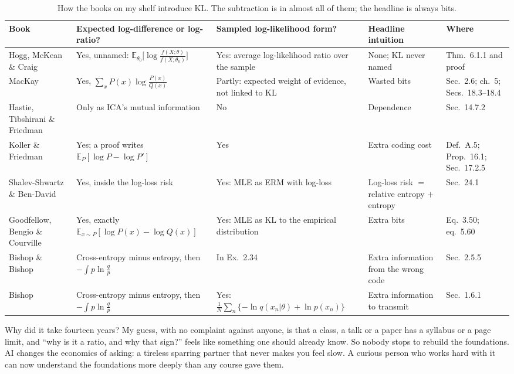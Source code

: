 \documentclass[11pt,oneside]{book}
\newcommand{\E}{\mathbb{E}}
\theoremstyle{definition}
\theoremstyle{plain}
\theoremstyle{remark}
\begin{document}
\begin{table}[h]
\centering\footnotesize
\renewcommand{\arraystretch}{1.2}
\begin{tabularx}{\textwidth}{@{}>{\raggedright\arraybackslash}p{3.0cm}>{\raggedright\arraybackslash}X>{\raggedright\arraybackslash}X>{\raggedright\arraybackslash}p{2.1cm}>{\raggedright\arraybackslash}p{2.3cm}@{}}
\toprule
Book & Expected log-difference or log-ratio? & Sampled log-likelihood form? & Headline intuition & Where\\
\midrule
Hogg, McKean \& Craig \cite{hogg2013} & Yes, unnamed: $\E_{\theta_0}\!\big[\log\frac{f(X;\theta)}{f(X;\theta_0)}\big]$ & Yes: average log-likelihood ratio over the sample & None; KL never named & Thm.~6.1.1 and proof\\
MacKay \cite{mackay2003} & Yes, $\sum_x P(x)\log\frac{P(x)}{Q(x)}$ & Partly: expected weight of evidence, not linked to KL & Wasted bits & Sec.~2.6; ch.~5; Secs.~18.3--18.4\\
Hastie, Tibshirani \& Friedman \cite{hastie2009} & Only as ICA's mutual information & No & Dependence & Sec.~14.7.2\\
Koller \& Friedman \cite{koller2009} & Yes; a proof writes $\E_P[\log P-\log P']$ & Yes & Extra coding cost & Def.~A.5; Prop.~16.1; Sec.~17.2.5\\
Shalev-Shwartz \& Ben-David \cite{ssbd2014} & Yes, inside the log-loss risk & Yes: MLE as ERM with log-loss & Log-loss risk $=$ relative entropy $+$ entropy & Sec.~24.1\\
Goodfellow, Bengio \& Courville \cite{goodfellow2016} & Yes, exactly $\E_{x\sim P}[\log P(x)-\log Q(x)]$ & Yes: MLE as KL to the empirical distribution & Extra bits & Eq.~3.50; eq.~5.60\\
Bishop \& Bishop \cite{bishop2024} & Cross-entropy minus entropy, then $-\int p\ln\frac qp$ & In Ex.~2.34 & Extra information from the wrong code & Sec.~2.5.5\\
Bishop \cite{bishop2006} & Cross-entropy minus entropy, then $-\int p\ln\frac qp$ & Yes: $\frac1N\sum_n\{-\ln q(x_n|\theta)+\ln p(x_n)\}$ & Extra information to transmit & Sec.~1.6.1\\
\bottomrule
\end{tabularx}
\caption{How the books on my shelf introduce KL. The subtraction is in almost all of them; the headline is always bits.}
\label{tab:books}
\end{table}

Why did it take fourteen years? My guess, with no complaint against anyone, is that a class, a talk or a paper has a
syllabus or a page limit, and ``why is it a ratio, and why that sign?'' feels like something one should already know.
So nobody stops to rebuild the foundations. AI changes the economics of asking: a tireless sparring partner that never
makes you feel slow. A curious person who works hard with it can now understand the foundations more deeply than any
course gave them.
\end{document}
